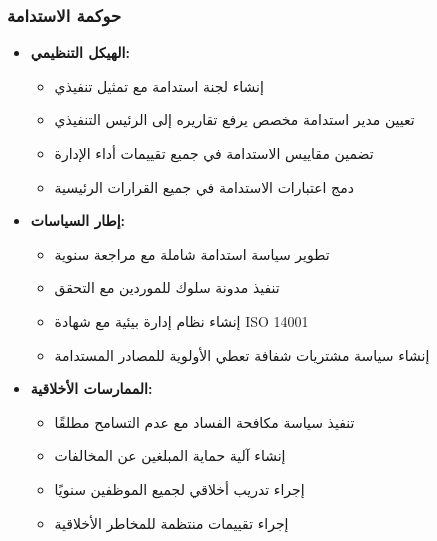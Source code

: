 \subsubsection{حوكمة الاستدامة}
\begin{itemize}
    \item \textbf{الهيكل التنظيمي:}
    \begin{itemize}
        \item إنشاء لجنة استدامة مع تمثيل تنفيذي
        \item تعيين مدير استدامة مخصص يرفع تقاريره إلى الرئيس التنفيذي
        \item تضمين مقاييس الاستدامة في جميع تقييمات أداء الإدارة
        \item دمج اعتبارات الاستدامة في جميع القرارات الرئيسية
    \end{itemize}
    
    \item \textbf{إطار السياسات:}
    \begin{itemize}
        \item تطوير سياسة استدامة شاملة مع مراجعة سنوية
        \item تنفيذ مدونة سلوك للموردين مع التحقق
        \item إنشاء نظام إدارة بيئية مع شهادة ISO 14001
        \item إنشاء سياسة مشتريات شفافة تعطي الأولوية للمصادر المستدامة
    \end{itemize}
    
    \item \textbf{الممارسات الأخلاقية:}
    \begin{itemize}
        \item تنفيذ سياسة مكافحة الفساد مع عدم التسامح مطلقًا
        \item إنشاء آلية حماية المبلغين عن المخالفات
        \item إجراء تدريب أخلاقي لجميع الموظفين سنويًا
        \item إجراء تقييمات منتظمة للمخاطر الأخلاقية
    \end{itemize}
\end{itemize}

